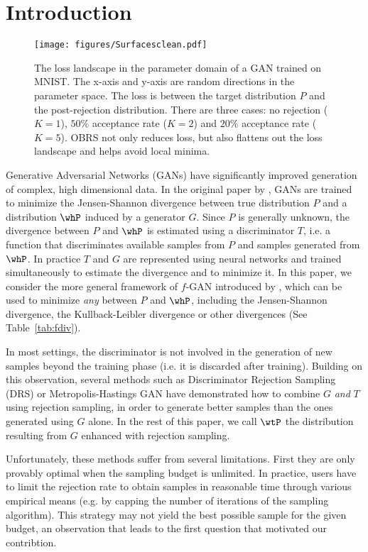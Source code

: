 \documentclass[twoside]{article}
\begin{document}
\section{Introduction}
\begin{figure*}[t]
    \centering
    \texttt{[image: figures/Surfacesclean.pdf]}
    \caption{The loss landscape in the parameter domain of a GAN trained on MNIST. The x-axis and y-axis are random directions in the parameter space. The loss is between the target distribution $P$ and the post-rejection distribution. There are three cases: no rejection ($K=1$), $50\%$  acceptance rate ($K=2$) and $20\%$  acceptance rate ($K=5$). OBRS not only reduces loss, but also flattens out the loss landscape and helps avoid  local minima.}\label{fig:MNISTSmooth}
\end{figure*}
Generative Adversarial Networks (GANs)  have significantly improved generation of complex, high dimensional data. In the original paper by \citet{goodfellow_generative_2014}, GANs are trained to  minimize the Jensen-Shannon divergence between true distribution $P$ and a distribution $\whP$ induced by a generator $G$.
Since $P$ is generally unknown, the divergence between $P$ and $\whP$ is estimated using a discriminator $T$, i.e. a function that discriminates available samples from $P$ and samples generated from $\whP$. In practice $T$ and $G$ are  represented using neural networks and trained simultaneously to estimate the divergence and to minimize it. In this paper, we consider the more general framework of $f$-GAN introduced by \citet{nowozin_f-gan_2016}, which  can be used to minimize {\em any} \fdiv between $P$ and  $\whP$, including the Jensen-Shannon divergence, the Kullback-Leibler divergence or other divergences (See Table~\ref{tab:fdiv}).

In most settings, the discriminator is not involved in the generation of new samples beyond the training phase (i.e. it is discarded after training). Building on this observation, several methods  such as  Discriminator Rejection Sampling (DRS) \citep{azadi_discriminator_2019} or Metropolis-Hastings GAN \citep{turner_metropolis-hastings_2019} have demonstrated how to combine $G$ \emph{and} $T$ using rejection sampling, in order to generate better samples than the ones generated using $G$ alone. 
In the rest of this paper, we call $\wtP$ the distribution resulting from $G$ enhanced with rejection sampling.



Unfortunately, these methods suffer from several limitations. First they are only provably optimal when the sampling budget is unlimited. In practice, users have to limit the rejection rate to obtain samples in reasonable time through various empirical means (e.g. by capping the number of iterations of the sampling algorithm). This strategy may not  yield the best possible sample for the given budget, an observation that leads to the first question that motivated our contribtion. 
\end{document}
